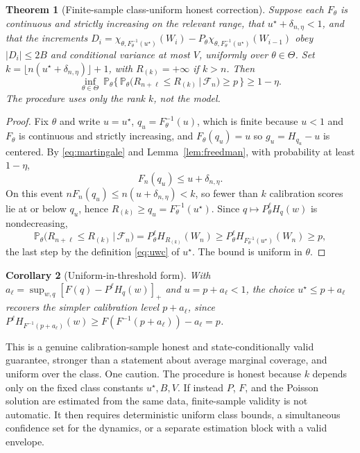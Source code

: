 \documentclass[11pt]{article}
\newtheorem{theorem}{Theorem}
\newtheorem{corollary}[theorem]{Corollary}
\theoremstyle{definition}
\theoremstyle{remark}
\newcommand{\Prob}{\mathbb{P}}
\newcommand{\given}{\,|\,}
\newcommand{\Fcal}{\mathcal{F}}
\begin{document}
\begin{theorem}[Finite-sample class-uniform honest correction]\label{thm:honest}
Suppose each $F_\theta$ is continuous and strictly increasing on the relevant range, that
$u^\star+\delta_{n,\eta}<1$, and that the increments $D_i=\chi_{\theta,F_\theta^{-1}(u^\star)}
(W_i)-P_\theta\chi_{\theta,F_\theta^{-1}(u^\star)}(W_{i-1})$ obey $|D_i|\le 2B$ and conditional
variance at most $V$, uniformly over $\theta\in\Theta$. Set $k=\lfloor n(u^\star+
\delta_{n,\eta})\rfloor+1$, with $R_{(k)}=+\infty$ if $k>n$. Then
\begin{equation}\label{eq:honest-guarantee}
  \inf_{\theta\in\Theta}\ \Prob_\theta\Big\{\, \Prob_\theta\big(R_{n+\ell}\le R_{(k)}\given
    \Fcal_n\big) \ge p \,\Big\} \ge 1-\eta .
\end{equation}
The procedure uses only the rank $k$, not the model.
\end{theorem}

\begin{proof}
Fix $\theta$ and write $u=u^\star$, $q_u=F_\theta^{-1}(u)$, which is finite because $u<1$ and
$F_\theta$ is continuous and strictly increasing, and $F_\theta(q_u)=u$ so $g_u=H_{q_u}-u$ is
centered. By \eqref{eq:martingale} and Lemma~\ref{lem:freedman}, with probability at least
$1-\eta$,
\[
  F_n(q_u) \le u + \delta_{n,\eta} .
\]
On this event $nF_n(q_u)\le n(u+\delta_{n,\eta})<k$, so fewer than $k$ calibration scores lie
at or below $q_u$, hence $R_{(k)}\ge q_u=F_\theta^{-1}(u^\star)$. Since $q\mapsto P_\theta^\ell
H_q(w)$ is nondecreasing,
\[
  \Prob_\theta\big(R_{n+\ell}\le R_{(k)}\given\Fcal_n\big)
    = P_\theta^{\ell}H_{R_{(k)}}(W_n)
    \ge P_\theta^{\ell}H_{F_\theta^{-1}(u^\star)}(W_n)
    \ge p ,
\]
the last step by the definition \eqref{eq:uwc} of $u^\star$. The bound is uniform in
$\theta$.
\end{proof}

\begin{corollary}[Uniform-in-threshold form]\label{cor:al}
With $a_\ell=\sup_{w,q}[F(q)-P^\ell H_q(w)]_+$ and $u=p+a_\ell<1$, the choice $u^\star\le
p+a_\ell$ recovers the simpler calibration level $p+a_\ell$, since $P^\ell H_{F^{-1}(p+a_\ell)}
(w)\ge F(F^{-1}(p+a_\ell))-a_\ell=p$.
\end{corollary}

This is a genuine calibration-sample honest and state-conditionally valid guarantee, stronger
than a statement about average marginal coverage, and uniform over the class. One caution.
The procedure is honest because $k$ depends only on the fixed class constants $u^\star,B,V$.
If instead $P$, $F$, and the Poisson solution are estimated from the same data, finite-sample
validity is not automatic. It then requires deterministic uniform class bounds, a
simultaneous confidence set for the dynamics, or a separate estimation block with a valid
envelope.
\end{document}
